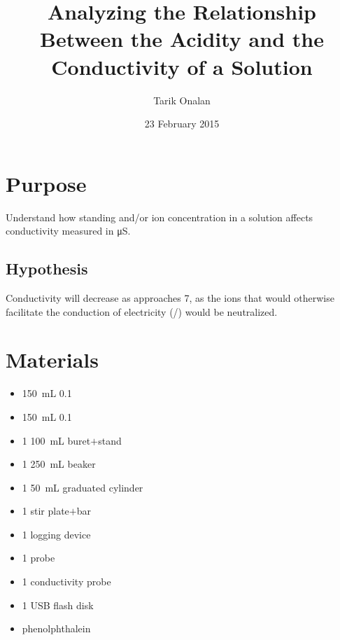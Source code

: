 \documentclass[a4paper]{article}
\title{Analyzing the Relationship Between the Acidity and the Conductivity of a Solution}
\date{23 February 2015}
\author{Tarik Onalan}
\newcommand{\pH}{\text{pH}}
\begin{document}
    \maketitle
    \section{Purpose}
        Understand how standing  and/or  ion concentration in a solution affects conductivity
        measured in \si{\micro\siemens}.
        \subsection{Hypothesis}
            Conductivity will decrease as \pH{} approaches 7, as the ions that would
            otherwise facilitate the conduction of electricity (/)
            would be neutralized.
    \section{Materials}
        \begin{itemize}
            \item \SI{150}{\mL} \SI{0.1}{\Molar} 
            \item \SI{150}{\mL} \SI{0.1}{\Molar} 
            \item 1 \SI{100}{\mL} buret$+$stand
            \item 1 \SI{250}{\mL} beaker
            \item 1 \SI{50}{\mL} graduated cylinder
            \item 1 stir plate$+$bar
            \item 1 logging device
            \item 1 \pH probe
            \item 1 conductivity probe
            \item 1 USB flash disk
            \item phenolphthalein
        \end{itemize}
\end{document}
